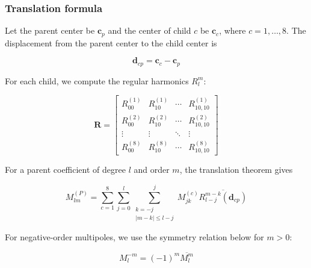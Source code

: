 \subsubsection{Translation formula}

Let the parent center be \(\mathbf{c}_p\) and the center of child \(c\) be \(\mathbf{c}_c\), where \(c=1,\ldots,8\). The displacement from the parent center to the child center is

\[
\mathbf{d}_{cp}
= \mathbf{c}_c
-
\mathbf{c}_p
\]

For each child, we compute the regular harmonics \(R_l^m\):

\[
\mathbf R=
\begin{bmatrix}
R_{00}^{(1)} & R_{10}^{(1)} & \cdots & R_{10,10}^{(1)}\\
R_{00}^{(2)} & R_{10}^{(2)} & \cdots & R_{10,10}^{(2)}\\
\vdots & \vdots & \ddots & \vdots\\
R_{00}^{(8)} & R_{10}^{(8)} & \cdots & R_{10,10}^{(8)}
\end{bmatrix}
\]

For a parent coefficient of degree \(l\) and order \(m\), the translation theorem gives

\[
M_{lm}^{(P)}
=
\sum_{c=1}^{8}
\sum_{j=0}^{l}
\sum_{\substack{k=-j\\|m-k|\le l-j}}^{j}
M_{jk}^{(c)}
\overline{R_{l-j}^{m-k}(\mathbf d_{cp})}
\]

For negative-order multipoles, we use the symmetry relation below for \(m>0\):

\[
M_{l}^{-m}
=
(-1)^{m}
\overline{M_{l}^{m}}
\]